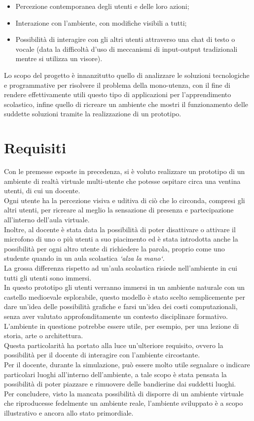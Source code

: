 \begin{itemize}
    \item Percezione contemporanea degli utenti e delle loro azioni;
    \item Interazione con l'ambiente, con modifiche visibili a tutti;
    \item Possibilità di interagire con gli altri utenti attraverso una chat di testo o vocale (data la difficoltà d’uso di meccanismi di input-output tradizionali mentre si utilizza un visore).
\end{itemize}
Lo scopo del progetto è innanzitutto quello di analizzare le soluzioni tecnologiche e programmative per risolvere il problema della mono-utenza, con il fine di rendere effettivamente utili questo tipo di applicazioni per l'apprendimento scolastico, infine quello di ricreare un ambiente che mostri il funzionamento delle suddette soluzioni tramite la realizzazione di un prototipo.
\section{Requisiti}
Con le premesse esposte in precedenza, si è voluto realizzare un prototipo di un ambiente di realtà virtuale multi-utente che potesse ospitare circa una ventina utenti, di cui un docente.
\\Ogni utente ha la percezione visiva e uditiva di ciò che lo circonda, compresi gli altri utenti, per ricreare al meglio la sensazione di presenza e partecipazione all'interno dell'aula virtuale.
\\Inoltre, al docente è stata data la possibilità di poter disattivare o attivare il microfono di uno o più utenti a suo piacimento ed è stata introdotta anche la possibilità per ogni altro utente di richiedere la parola, proprio come uno studente quando in un aula scolastica \textit{`alza la mano`}.
\\La grossa differenza rispetto ad un'aula scolastica risiede nell'ambiente in cui tutti gli utenti sono immersi. 
\\In questo prototipo gli utenti verranno immersi in un ambiente naturale con un castello medioevale esplorabile, questo modello è stato scelto semplicemente per dare un’idea delle possibilità grafiche e farsi un’idea dei costi computazionali, senza aver valutato approfonditamente un contesto disciplinare formativo.
\\L'ambiente in questione potrebbe essere utile, per esempio, per una lezione di storia, arte o architettura.
\\Questa particolarità ha portato alla luce un'ulteriore requisito, ovvero la possibilità per il docente di interagire con l'ambiente circostante.
\\Per il docente, durante la simulazione, può essere molto utile segnalare o indicare particolari luoghi all'interno dell'ambiente, a tale scopo è stata pensata la possibilità di poter piazzare e rimuovere delle bandierine dai suddetti luoghi.
\\Per concludere, visto la mancata possibilità di disporre di un ambiente virtuale che riproducesse fedelmente un ambiente reale, l'ambiente sviluppato è a scopo illustrativo e ancora allo stato primordiale.
